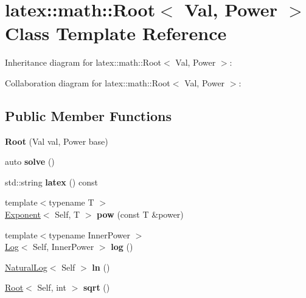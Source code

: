 \hypertarget{classlatex_1_1math_1_1Root}{\section{latex\-:\-:math\-:\-:\-Root$<$ \-Val, \-Power $>$ \-Class \-Template \-Reference}
\label{classlatex_1_1math_1_1Root}
}


\-Inheritance diagram for latex\-:\-:math\-:\-:\-Root$<$ \-Val, \-Power $>$\-:


\-Collaboration diagram for latex\-:\-:math\-:\-:\-Root$<$ \-Val, \-Power $>$\-:
\subsection*{\-Public \-Member \-Functions}
\begin{DoxyCompactItemize}
\item 
\hypertarget{classlatex_1_1math_1_1Root_a5457dc9b5582666b2bfaf2ea1342ec8a}{{\bfseries \-Root} (\-Val val, \-Power base)}\label{classlatex_1_1math_1_1Root_a5457dc9b5582666b2bfaf2ea1342ec8a}

\item 
\hypertarget{classlatex_1_1math_1_1Root_a97fe8f491bf5c90605d6f6aed7073a3a}{auto {\bfseries solve} ()}\label{classlatex_1_1math_1_1Root_a97fe8f491bf5c90605d6f6aed7073a3a}

\item 
\hypertarget{classlatex_1_1math_1_1Root_a7c2119b0146924a8388cbeaa72c4894d}{std\-::string {\bfseries latex} () const }\label{classlatex_1_1math_1_1Root_a7c2119b0146924a8388cbeaa72c4894d}

\item 
\hypertarget{classlatex_1_1math_1_1Root_a681826f8372d009b0cfd9acc335e19ae}{{\footnotesize template$<$typename T $>$ }\\\hyperlink{classlatex_1_1math_1_1Exponent}{\-Exponent}$<$ \-Self, \-T $>$ {\bfseries pow} (const \-T \&power)}\label{classlatex_1_1math_1_1Root_a681826f8372d009b0cfd9acc335e19ae}

\item 
\hypertarget{classlatex_1_1math_1_1Root_aa278a24731fa57ed7e4d0615998398a0}{{\footnotesize template$<$typename Inner\-Power $>$ }\\\hyperlink{classlatex_1_1math_1_1Log}{\-Log}$<$ \-Self, \-Inner\-Power $>$ {\bfseries log} ()}\label{classlatex_1_1math_1_1Root_aa278a24731fa57ed7e4d0615998398a0}

\item 
\hypertarget{classlatex_1_1math_1_1Root_aff88b4d579979681a8794881aab0646c}{\hyperlink{classlatex_1_1math_1_1NaturalLog}{\-Natural\-Log}$<$ \-Self $>$ {\bfseries ln} ()}\label{classlatex_1_1math_1_1Root_aff88b4d579979681a8794881aab0646c}

\item 
\hypertarget{classlatex_1_1math_1_1Root_ab924cd8aa34a6284bd6b7b44610ec088}{\hyperlink{classlatex_1_1math_1_1Root}{\-Root}$<$ \-Self, int $>$ {\bfseries sqrt} ()}\label{classlatex_1_1math_1_1Root_ab924cd8aa34a6284bd6b7b44610ec088}

\end{DoxyCompactItemize}
